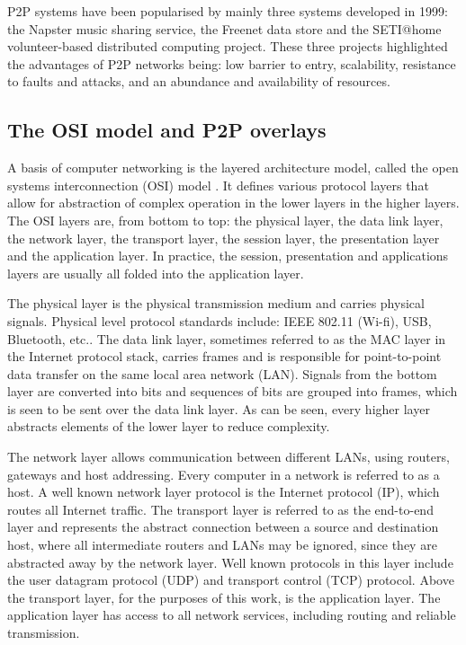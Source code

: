 P2P systems have been popularised by mainly three systems developed in 1999: the Napster music sharing service, the Freenet data store and the SETI@home volunteer-based distributed computing project. These three projects highlighted the advantages of P2P networks being: low barrier to entry, scalability, resistance to faults and attacks, and an abundance and availability of resources.

\subsection{The OSI model and P2P overlays}

A basis of computer networking is the layered architecture model, called the open systems interconnection (OSI) model \cite{OSI_protocol_stack}. It defines various protocol layers that allow for abstraction of complex operation in the lower layers in the higher layers. The OSI layers are, from bottom to top: the physical layer, the data link layer, the network layer, the transport layer, the session layer, the presentation layer and the application layer. In practice, the session, presentation and applications layers are usually all folded into the application layer.

The physical layer is the physical transmission medium and carries physical signals. Physical level protocol standards include: IEEE 802.11 (Wi-fi), USB, Bluetooth, etc.. The data link layer, sometimes referred to as the MAC layer in the Internet protocol stack, carries frames and is responsible for point-to-point data transfer on the same local area network (LAN). Signals from the bottom layer are converted into bits and sequences of bits are grouped into frames, which is seen to be sent over the data link layer. As can be seen, every higher layer abstracts elements of the lower layer to reduce complexity.

The network layer allows communication between different LANs, using routers, gateways and host addressing. Every computer in a network is referred to as a host. A well known network layer protocol is the Internet protocol (IP), which routes all Internet traffic. The transport layer is referred to as the end-to-end layer and represents the abstract connection between a source and destination host, where all intermediate routers and LANs may be ignored, since they are abstracted away by the network layer. Well known protocols in this layer include the user datagram protocol (UDP) and transport control (TCP) protocol. Above the transport layer, for the purposes of this work, is the application layer. The application layer has access to all network services, including routing and reliable transmission.


